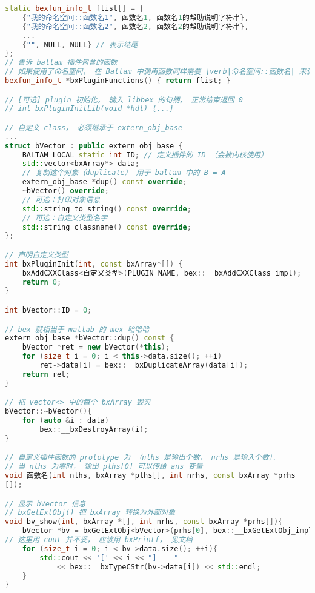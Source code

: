 \begin{lstlisting}[language=cpp,caption=vector 插件的 main.cpp]
static bexfun_info_t flist[] = {
    {"我的命名空间::函数名1", 函数名1, 函数名1的帮助说明字符串},
    {"我的命名空间::函数名2", 函数名2, 函数名2的帮助说明字符串},
    ...
    {"", NULL, NULL} // 表示结尾
};
// 告诉 baltam 插件包含的函数
// 如果使用了命名空间， 在 Baltam 中调用函数同样需要 \verb|命名空间::函数名| 来调用
bexfun_info_t *bxPluginFunctions() { return flist; }

// [可选] plugin 初始化， 输入 libbex 的句柄， 正常结束返回 0
// int bxPluginInitLib(void *hdl) {...}

// 自定义 class， 必须继承于 extern_obj_base
...
struct bVector : public extern_obj_base {
    BALTAM_LOCAL static int ID; // 定义插件的 ID （会被内核使用）
    std::vector<bxArray*> data;
    // 复制这个对象（duplicate） 用于 baltam 中的 B = A
    extern_obj_base *dup() const override;
    ~bVector() override;
    // 可选：打印对象信息
    std::string to_string() const override;
    // 可选：自定义类型名字
    std::string classname() const override;
};

// 声明自定义类型
int bxPluginInit(int, const bxArray*[]) {
    bxAddCXXClass<自定义类型>(PLUGIN_NAME, bex::__bxAddCXXClass_impl);
    return 0;
}

int bVector::ID = 0;

// bex 就相当于 matlab 的 mex 哈哈哈
extern_obj_base *bVector::dup() const {
    bVector *ret = new bVector(*this);
    for (size_t i = 0; i < this->data.size(); ++i)
        ret->data[i] = bex::__bxDuplicateArray(data[i]);
    return ret;
}

// 把 vector<> 中的每个 bxArray 毁灭
bVector::~bVector(){
    for (auto &i : data)
        bex::__bxDestroyArray(i);
}

// 自定义插件函数的 prototype 为 （nlhs 是输出个数， nrhs 是输入个数）．
// 当 nlhs 为零时， 输出 plhs[0] 可以传给 ans 变量
void 函数名(int nlhs, bxArray *plhs[], int nrhs, const bxArray *prhs
[]);

// 显示 bVector 信息
// bxGetExtObj() 把 bxArray 转换为外部对象
void bv_show(int, bxArray *[], int nrhs, const bxArray *prhs[]){
    bVector *bv = bxGetExtObj<bVector>(prhs[0], bex::__bxGetExtObj_impl);
// 这里用 cout 并不妥， 应该用 bxPrintf， 见文档
    for (size_t i = 0; i < bv->data.size(); ++i){
        std::cout << '[' << i << "]    "
            << bex::__bxTypeCStr(bv->data[i]) << std::endl;
    }
}
\end{lstlisting}

